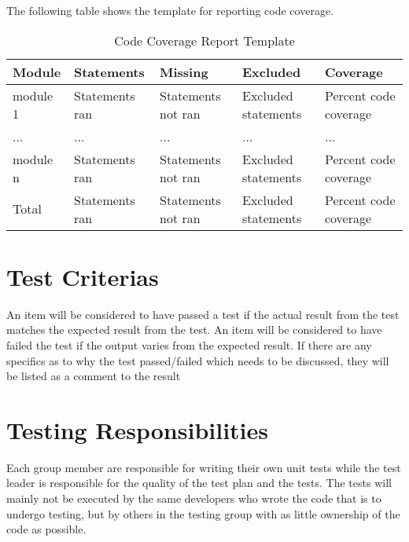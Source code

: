 The following table shows the template for reporting code coverage.

\begin{table}[!htb]\footnotesize\center
	\caption{Code Coverage Report Template\label{tab:TestCoverageReport}}
	\begin{tabular}{l l l l l}
		\toprule
		Module & Statements & Missing & Excluded & Coverage\\
		\midrule
		module 1 & Statements ran & Statements not ran  & Excluded statements & Percent code coverage\ \\
		... & ... & ... & ... & ... \\
		module n & Statements ran & Statements not ran & Excluded statements  & Percent code coverage \\
		\bottomrule
		Total & Statements ran & Statements not ran & Excluded statements & Percent code coverage \\
		\bottomrule
	\end{tabular}
\end{table}


\section{Test Criterias}
An item will be considered to have passed a test if the actual result from the test matches the expected result from the test. An item will be considered to have failed the test if the output varies from the expected result. If there are any specifics as to why the test passed/failed which needs to be discussed, they will be listed as a comment to the result


\section{Testing Responsibilities}
Each group member are responsible for writing their own unit tests while the test leader is responsible for the quality of the test plan and the tests. The tests will mainly not be executed by the same developers who wrote the code that is to undergo testing, but by others in the testing group with as little ownership of the code as possible. 


